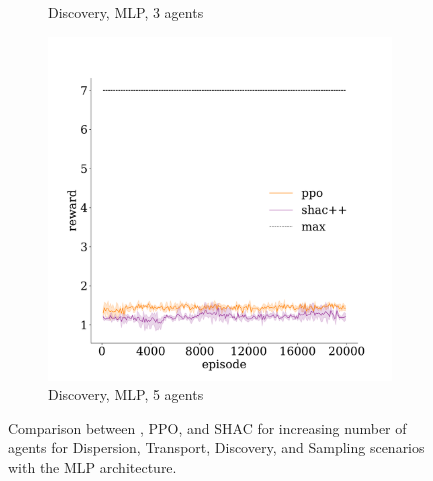 \begin{figure}[t]
\begin{subfigure}[b]{0.30\textwidth}
        \caption{Discovery, MLP, 3 agents}
        \label{apx:fig:discovery-mlp-3}
    \end{subfigure}
    \begin{subfigure}[b]{0.30\textwidth}
        \includegraphics[width=\textwidth]{figs/discovery-5-mlp.pdf}
        \caption{Discovery, MLP, 5 agents}
        \label{apx:fig:discovery-mlp-5}
    \end{subfigure}

    \caption{Comparison between \fname{}, PPO, and SHAC for increasing number of agents for Dispersion, Transport, Discovery, and Sampling scenarios with the MLP architecture.}
    \label{apx:fig:experiments-mlp}

\end{figure}

